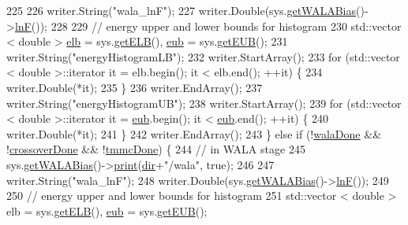 \begin{DoxyCode}
225 
226         writer.String(\textcolor{stringliteral}{"wala\_lnF"});
227         writer.Double(sys.\hyperlink{classsim_system_a7cb5049de8b0988349e89e30e4000407}{getWALABias}()->\hyperlink{classwala_acb8e59580d97bc3c5b9b4ff45eb6bb9a}{lnF}());
228 
229         \textcolor{comment}{// energy upper and lower bounds for histogram}
230         std::vector < double > \hyperlink{classcheckpoint_a2338cb624f19eb6776c10f9bb83b2a5d}{elb} = sys.\hyperlink{classsim_system_a610cbb1c6059151e420dbd42dd9da714}{getELB}(), \hyperlink{classcheckpoint_a7071b01d0936873321d0a706e761b6ac}{eub} = sys.\hyperlink{classsim_system_ae87e0ac03cc11259cd3b44c780a90a06}{getEUB}();
231         writer.String(\textcolor{stringliteral}{"energyHistogramLB"});
232         writer.StartArray();
233         \textcolor{keywordflow}{for} (std::vector < double >::iterator it = elb.begin(); it < elb.end(); ++it) \{
234             writer.Double(*it);
235         \}
236         writer.EndArray();
237         writer.String(\textcolor{stringliteral}{"energyHistogramUB"});
238         writer.StartArray();
239         \textcolor{keywordflow}{for} (std::vector < double >::iterator it = \hyperlink{classcheckpoint_a7071b01d0936873321d0a706e761b6ac}{eub}.begin(); it < \hyperlink{classcheckpoint_a7071b01d0936873321d0a706e761b6ac}{eub}.end(); ++it) \{
240             writer.Double(*it);
241         \}
242         writer.EndArray();
243     \} \textcolor{keywordflow}{else} \textcolor{keywordflow}{if} (!\hyperlink{classcheckpoint_aab066479e2ca6656d0031dd46a2fc1a5}{walaDone} && !\hyperlink{classcheckpoint_a4f13612ea6d376bb327295bfce3a70c5}{crossoverDone} && !\hyperlink{classcheckpoint_acbe0c62aa82735741a9f396827966823}{tmmcDone}) \{
244         \textcolor{comment}{// in WALA stage}
245         sys.\hyperlink{classsim_system_a7cb5049de8b0988349e89e30e4000407}{getWALABias}()->\hyperlink{classwala_a65569289fac85d0da9c336e17c9d809a}{print}(\hyperlink{classcheckpoint_a0e0f999ee8e0b09541e9131baa8a591d}{dir}+\textcolor{stringliteral}{"/wala"}, \textcolor{keyword}{true});
246 
247         writer.String(\textcolor{stringliteral}{"wala\_lnF"});
248         writer.Double(sys.\hyperlink{classsim_system_a7cb5049de8b0988349e89e30e4000407}{getWALABias}()->\hyperlink{classwala_acb8e59580d97bc3c5b9b4ff45eb6bb9a}{lnF}());
249 
250         \textcolor{comment}{// energy upper and lower bounds for histogram}
251         std::vector < double > elb = sys.\hyperlink{classsim_system_a610cbb1c6059151e420dbd42dd9da714}{getELB}(), \hyperlink{classcheckpoint_a7071b01d0936873321d0a706e761b6ac}{eub} = sys.\hyperlink{classsim_system_ae87e0ac03cc11259cd3b44c780a90a06}{getEUB}();

\end{DoxyCode}
